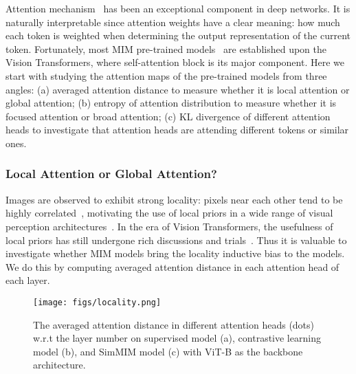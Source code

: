 \documentclass{article}
\begin{document}
Attention mechanism~\cite{bahdanau2014neural} has been an exceptional component in deep networks. It is naturally interpretable since attention weights have a clear meaning: how much each token is weighted when determining the output representation of the current token. Fortunately, most MIM pre-trained models~\cite{dosovitskiy2020vit,bao2021beit,he2021masked,zhou2021ibot,xie2021simmim} are established upon the Vision Transformers, where self-attention block is its major component. Here we start with studying the attention maps of the pre-trained models from three angles: (a) averaged attention distance to measure whether it is local attention or global attention; (b) entropy of attention distribution to measure whether it is focused attention or broad attention; (c) KL divergence of different attention heads to investigate that attention heads are attending different tokens or similar ones.


\subsubsection{Local Attention or Global Attention?}
Images are observed to exhibit strong locality: pixels near each other tend to be highly correlated~\cite{hubel1962receptive}, motivating the use of local priors in a wide range of visual perception architectures~\cite{fukushima1975cognitron,lecun1999object,alexnet,he2016resnet,liu2021swin}. In the era of Vision Transformers, the usefulness of local priors has still undergone rich discussions and trials~\cite{dosovitskiy2020vit,liu2021swin,li2021localvit}. Thus it is valuable to investigate whether MIM models bring the locality inductive bias to the models. We do this by computing averaged attention distance in each attention head of each layer. 

\begin{figure}
    \centering
    \texttt{[image: figs/locality.png]}
	    \vspace{-1.5em}
    \caption{The averaged attention distance in different attention heads (dots) w.r.t the layer number on supervised model (a), contrastive learning model (b), and SimMIM model (c) with ViT-B as the backbone architecture.}
    \label{fig:locality}
\end{figure}
\end{document}
